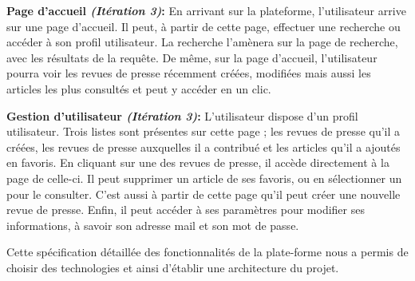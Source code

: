 	\textbf{Page d'accueil \textit{(Itération 3)}:} En arrivant sur la plateforme, l'utilisateur arrive sur une page d'accueil. Il peut, à partir de cette page, effectuer une recherche ou accéder à son profil utilisateur. La recherche l'amènera sur la page de recherche, avec les résultats de la requête. De même, sur la page d'accueil, l'utilisateur pourra voir les revues de presse récemment créées, modifiées mais aussi les articles les plus consultés et peut y accéder en un clic.

	\textbf{Gestion d'utilisateur \textit{(Itération 3)}:} L'utilisateur dispose d'un profil utilisateur. Trois listes sont présentes sur cette page ; les revues de presse qu'il a créées, les revues de presse auxquelles il a contribué et les articles qu'il a ajoutés en favoris. En cliquant sur une des revues de presse, il accède directement à la page de celle-ci. Il peut supprimer un article de ses favoris, ou en sélectionner un pour le consulter. C'est aussi à partir de cette page qu'il peut créer une nouvelle revue de presse. Enfin, il peut accéder à ses paramètres pour modifier ses informations, à savoir son adresse mail et son mot de passe.

Cette spécification détaillée des fonctionnalités de la plate-forme nous a permis de choisir des technologies et ainsi d'établir une architecture du projet.